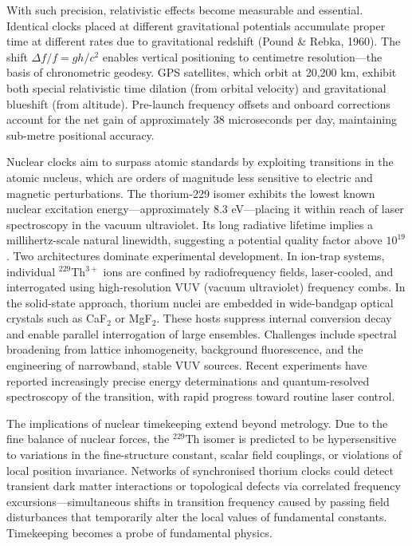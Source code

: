 With such precision, relativistic effects become measurable and essential. Identical clocks placed at different gravitational potentials accumulate proper time at different rates due to gravitational redshift (Pound \& Rebka, 1960). The shift $\Delta f/f = gh/c^2$ enables vertical positioning to centimetre resolution—the basis of chronometric geodesy. GPS satellites, which orbit at 20,200 km, exhibit both special relativistic time dilation (from orbital velocity) and gravitational blueshift (from altitude). Pre-launch frequency offsets and onboard corrections account for the net gain of approximately 38 microseconds per day, maintaining sub-metre positional accuracy.

Nuclear clocks aim to surpass atomic standards by exploiting transitions in the atomic nucleus, which are orders of magnitude less sensitive to electric and magnetic perturbations. The thorium-229 isomer exhibits the lowest known nuclear excitation energy—approximately 8.3 eV—placing it within reach of laser spectroscopy in the vacuum ultraviolet. Its long radiative lifetime implies a millihertz-scale natural linewidth, suggesting a potential quality factor above $10^{19}$. Two architectures dominate experimental development. In ion-trap systems, individual $^{229}$Th$^{3+}$ ions are confined by radiofrequency fields, laser-cooled, and interrogated using high-resolution VUV (vacuum ultraviolet) frequency combs. In the solid-state approach, thorium nuclei are embedded in wide-bandgap optical crystals such as CaF$_2$ or MgF$_2$. These hosts suppress internal conversion decay and enable parallel interrogation of large ensembles. Challenges include spectral broadening from lattice inhomogeneity, background fluorescence, and the engineering of narrowband, stable VUV sources. Recent experiments have reported increasingly precise energy determinations and quantum-resolved spectroscopy of the transition, with rapid progress toward routine laser control.

The implications of nuclear timekeeping extend beyond metrology. Due to the fine balance of nuclear forces, the $^{229}$Th isomer is predicted to be hypersensitive to variations in the fine-structure constant, scalar field couplings, or violations of local position invariance. Networks of synchronised thorium clocks could detect transient dark matter interactions or topological defects via correlated frequency excursions—simultaneous shifts in transition frequency caused by passing field disturbances that temporarily alter the local values of fundamental constants. Timekeeping becomes a probe of fundamental physics.

